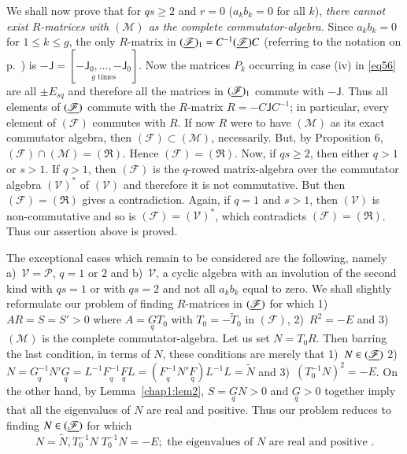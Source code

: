 We shall now prove that for $qs\geq 2$ and $r=0$ (\ie $a_{k}b_{k}=0$
for all $k$), {\em there cannot exist $R$-matrices with
  $(\mathscr{M})$ as the complete commutator-algebra.} Since
$a_{k}b_{k}=0$ for $1\leq k\leq g$, the only $R$-matrix in
$(\underline{\mathscr{F}})_{1}=C^{-1}(\underline{\mathscr{F}})C$ (referring to the
notation on p.~\pageref{p77}) is
$-\mathsf{J}=[\underset{g \text{ times}}{-\mathsf{J}_{0},\ldots,-\mathsf{J}_{0}}]$. Now the
matrices $P_{k}$ occurring in case (iv) in \eqref{eq56} are all $\pm
E_{sq}$ and therefore all the matrices in $(\underline{\mathscr{F}})_{1}$
commute with $-\mathsf{J}$. Thus all elements of $(\underline{\mathscr{F}})$
commute with the $R$-matrix $R=-C\mathsf{J}C^{-1}$; in particular,
every element of $({\mathscr{F}})$ commutes with $R$. If now $R$ were
to have $(\mathscr{M})$ as its exact commutator algebra, then
$(\mathscr{F})\subset (\mathscr{M})$, necessarily. But, by Proposition
6, $(\mathscr{F})\cap (\mathscr{M})=(\mathfrak{R})$. Hence
$(\mathscr{F})=(\mathfrak{R})$. Now, if $qs\geq 2$, then either $q>1$
or $s>1$. If $q>1$, then $(\mathscr{F})$ is the $q$-rowed
matrix-algebra over the commutator algebra\pageoriginale
$(\mathscr{V})^{\ast}$ of 
$(\mathscr{V})$ and therefore it is not commutative. But then
$(\mathscr{F})=(\mathfrak{R})$ gives a contradiction. Again, if $q=1$
and $s>1$, then $(\mathscr{V})$ is non-commutative and so is
$(\mathscr{F})=(\mathscr{V})^{\ast}$, which contradicts
$(\mathscr{F})=(\mathfrak{R})$. Thus our assertion above is proved.

The exceptional cases which remain to be considered are the following,
namely a)~$\mathscr{V}=\mathscr{P}$, $q=1$ or $2$ and
b)~$\mathscr{V}$, a cyclic algebra with an involution of the second
kind with $qs=1$ or with $qs=2$ and not all $a_{k}b_{k}$ equal to
zero. We shall slightly reformulate our problem of finding
$R$-matrices in $(\underline{\mathscr{F}})$ for which 1)~$AR=S=S'>0$ where
$A=\underset{q}{G}T_{0}$ with $T_{0}=-\widetilde{T}_{0}$ in
$(\mathscr{F})$, 2)~$R^{2}=-E$ and 3)~$(\mathscr{M})$ is the complete
commutator-algebra. Let us set $N=T_{0}R$. Then barring the last
condition, in terms of $N$, these conditions are merely that
1)~$N\in(\underline{\mathscr{F}})$ 
2)~$N=\underset{q}{G^{-1}}N'\underset{q}{G}=L^{-1}\underset{q}{F^{-1}}
\underset{q}{F}L=(\underset{q}{F^{-1}}N'\underset{q}{F})L^{-1}L=\widetilde{N}$  
and 3)~$(T^{-1}_{0}N)^{2}=-E$. On the other hand, by Lemma~\ref{chap1:lem2},
$S=\underset{q}{G}N>0$ and $\underset{q}{G}>0$ together imply that all
the eigenvalues of $N$ are real and positive. Thus our problem reduces
to finding $N\in(\underline{\mathscr{F}})$ for which 
\begin{equation*}
N=\widetilde{N},
T^{-1}_{0}N \; T^{-1}_{0}N=-E; \mbox{ the eigenvalues of } N \mbox{ are real and
positive }\tag{86}.\label{eq86}
\end{equation*}

